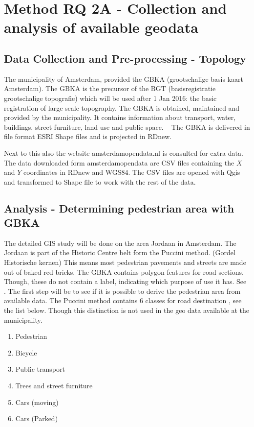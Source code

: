 \section{Method RQ 2A - Collection and analysis of available geodata}

\subsection{Data Collection and Pre-processing - Topology }
The municipality of Amsterdam, provided the GBKA (grootschalige basis kaart Amsterdam). The GBKA is the precursor of the BGT (basisregistratie grootschalige topografie) which will be used after 1 Jan 2016: the basic registration of large scale topography. The GBKA is obtained, maintained and provided by the municipality. It contains information about transport, water, buildings, street furniture, land use and public space. ~\cite{gbka} The GBKA is delivered in file format ESRI Shape files and is projected in RDnew. 

Next to this also the website amsterdamopendata.nl is consulted for extra data. ~\cite{opendata} The data downloaded form amsterdamopendata are CSV files containing the $X$ and $Y$ coordinates in RDnew and WGS84. The CSV files are opened with Qgis and transformed to Shape file to work with the rest of the data. 

\subsection{Analysis - Determining pedestrian area with GBKA}

The detailed GIS study will be done on the area Jordaan in Amsterdam. The Jordaan is part of the Historic Centre belt form the Puccini method. (Gordel Historische kernen) This means most pedestrian pavements and streets are made out of baked red bricks. \cite{puccini2014}
The GBKA contains polygon features for road sections. Though, these do not contain a label, indicating which purpose of use it has. See \cite{gbka}. The first step will be to see if it is possible to derive the pedestrian area from available data. The Puccini method contains 6 classes for road destination \cite{puccini2014}, see the list below. Though this distinction is not used in the geo data available at the municipality.

\begin{enumerate}
\item Pedestrian
\item Bicycle
\item Public transport
\item Trees and street furniture
\item Cars (moving)
\item Cars (Parked)
\end{enumerate}


